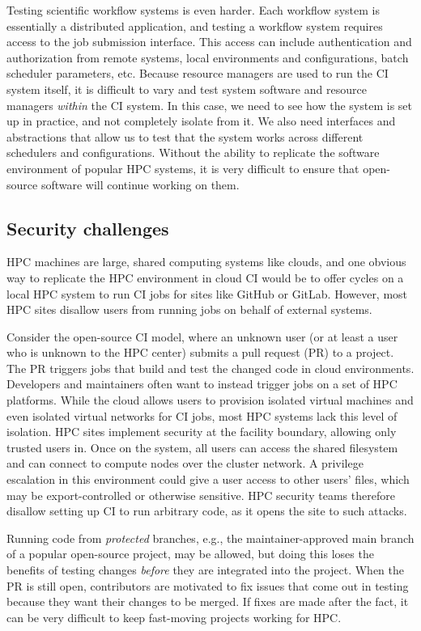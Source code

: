 \documentclass{IEEEcsmag}
\begin{document}
Testing scientific workflow systems is even harder. Each workflow system is essentially
a distributed application, and testing a workflow system requires access to the job
submission interface. This access can include authentication and authorization from
remote systems, local environments and configurations, batch scheduler parameters, etc.
Because resource managers are used to run the CI system itself, it is
difficult to vary and test system software and resource managers {\it within} the CI system. In
this case, we need to see how the system is set up in practice, and not completely
isolate from it. We also need interfaces and abstractions that allow us to test
that the system works across different schedulers and configurations.
Without the ability to replicate the software environment of popular HPC systems, it is
very difficult to ensure that open-source software will continue working on them.

\subsection{Security challenges}

HPC machines are large, shared computing systems like clouds, and one obvious way to
replicate the HPC environment in cloud CI would be to offer cycles on a local HPC system
to run CI jobs for sites like GitHub or GitLab. However, most HPC sites disallow users from
running jobs on behalf of external systems.

Consider the open-source CI model, where an unknown user (or at least a user who is
unknown to the HPC center) submits a pull request (PR) to a project. The PR triggers jobs
that build and test the changed code in cloud environments.
%
Developers and maintainers often want to instead trigger jobs on a set of HPC platforms.
%
While the cloud allows users to provision isolated virtual machines and even isolated
virtual networks for CI jobs, most HPC systems lack this level of isolation. HPC sites implement
security at the facility boundary, allowing only trusted users in.
Once on the system, all users can access the shared filesystem and can
connect to compute nodes over the cluster network. A privilege escalation in this
environment could give a user access to other users' files, which may be export-controlled
or otherwise sensitive. HPC security teams therefore disallow setting up CI
to run arbitrary code, as it opens the site to such attacks.

Running code from {\it protected} branches, e.g., the
maintainer-approved main branch of a popular open-source project, may be allowed, but doing
this loses the
benefits of testing changes {\it before} they are integrated into the project. When the
PR is still open, contributors are motivated to fix issues that come out in testing
because they want their changes to be merged. If fixes are made after the fact, it can
be very difficult to keep fast-moving projects working for HPC.
\end{document}
